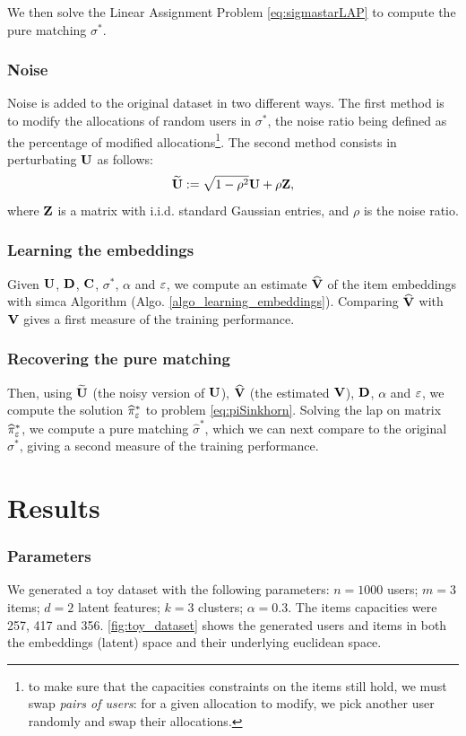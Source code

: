 We then solve the Linear Assignment Problem \eqref{eq:sigmastarLAP} to compute the pure matching $\sigma^*$.

\subsubsection*{Noise}
Noise is added to the original dataset in two different ways. The first method is to modify the allocations of random users in $\sigma^*$, the noise ratio being defined as the percentage of modified allocations\footnote{to make sure that the capacities constraints on the items still hold, we must swap \emph{pairs of users}: for a given allocation to modify, we pick another user randomly and swap their allocations.}. The second method consists in perturbating $\mathbf{U}$ as follows:
\begin{equation*}
    \widetilde{\mathbf{U}} := \sqrt{1-\rho^2} \mathbf{U} + \rho \mathbf{Z},
\end{equation*} where $\mathbf{Z}$ is a matrix with i.i.d. standard Gaussian entries, and $\rho$ is the noise ratio.

\subsubsection*{Learning the embeddings}
Given $\mathbf{U}$, $\mathbf{D}$, $\mathbf{C}$, $\sigma^*$, $\alpha$ and $\varepsilon$, we compute an estimate $\widehat{\mathbf{V}}$ of the item embeddings with \ac{simca} Algorithm (Algo. \ref{algo_learning_embeddings}). Comparing $\widehat{\mathbf{V}}$ with $\mathbf{V}$ gives a first measure of the training performance.

\subsubsection*{Recovering the pure matching}
Then, using $\widetilde{\mathbf{U}}$ (the noisy version of $\mathbf{U}$), $\widehat{\mathbf{V}}$ (the estimated $\mathbf{V}$), $\mathbf{D}$, $\alpha$ and $\varepsilon$, we compute the solution $\widehat{\pi}^*_{\varepsilon}$ to problem \eqref{eq:piSinkhorn}. Solving the \ac{lap} on matrix $\widehat{\pi}^*_{\varepsilon}$, we compute a pure matching $\widehat{\sigma}^*$, which we can next compare to the original ${\sigma}^*$, giving a second measure of the training performance.

\section{Results}

\subsubsection*{Parameters}
We generated a toy dataset with the following parameters: $n=1000$ users; $m=3$ items; $d=2$ latent features; $k=3$ clusters; $\alpha=0.3$. The items capacities were 257, 417 and 356. \cref{fig:toy_dataset} shows the generated users and items in both the embeddings (latent) space and their underlying euclidean space.

